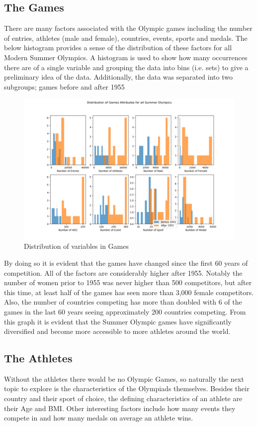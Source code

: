 \documentclass[a4 paper, 12pt]{article}
\begin{document}
    \subsection{The Games}
    There are many factors associated with the Olympic games including the number of entries, athletes (male and female), countries, events, sports and medals. The below histogram provides a sense of the distribution of these factors for all Modern Summer Olympics. A histogram is used to show how many occurrences there are of a single variable and grouping the data into bins (i.e. sets) to give a preliminary idea of the data. Additionally, the data was separated into two subgroups; games before and after 1955
        \begin{figure} [H]
            \centering
            \includegraphics[width=\textwidth, frame]
                {./images/graph/games_histogram.png}      
                \caption{Distribution of variables in Games} 
        \end{figure}
    By doing so it is evident that the games have changed since the first 60 years of competition. All of the factors are considerably higher after 1955. Notably the number of women prior to 1955 was never higher than 500 competitors, but after this time, at least half of the games has seen more than 3,000 female competitors. Also, the number of countries competing has more than doubled with 6 of the games in the last 60 years seeing approximately 200 countries competing. From this graph it is evident that the Summer Olympic games have significantly diversified and become more accessible to more athletes around the world.

    \subsection{The Athletes}
    Without the athletes there would be no Olympic Games, so naturally the next topic to explore is the characteristics of the Olympiads themselves. Besides their country and their sport of choice, the defining characteristics of an athlete are their Age and BMI. Other interesting factors include how many events they compete in and how many medals on average an athlete wins.
    
\end{document}
